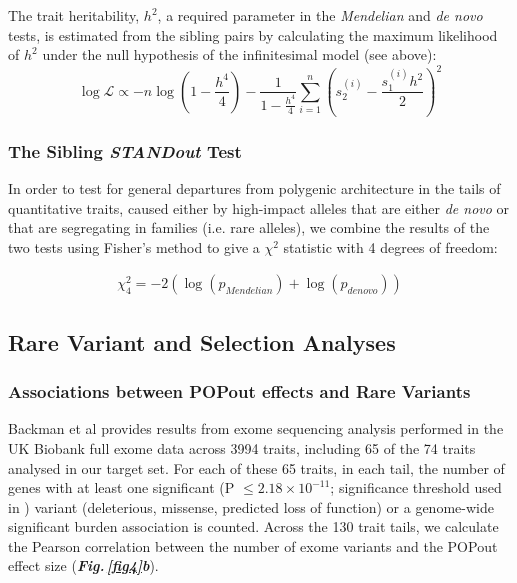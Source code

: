\documentclass[12pt]{zHenriquesLab-StyleBioRxiv}
\newcommand\dref[2]{\normalsize{\textbf{\textit{Fig.\,\ref{#1}#2}}}\normalsize{}}
\begin{document}
The trait heritability, $h^2$, a required parameter in the {\em Mendelian} and {\em de novo} tests, is estimated from the sibling pairs by calculating the maximum likelihood of $h^2$ 
under the null hypothesis of the infinitesimal model (see above): 
\begin{equation*} \log \mathcal{L} \propto -n\log\left(1 -
    \frac{h^4}{4}\right) - \frac{1}{1-\frac{h^4}{4}} \sum_{i=1}^n
  \left( s_{2}^{(i)} - \frac{s_1^{(i)} h^2}{2}
  \right)^2
\end{equation*}

\subsubsection*{The Sibling \textit{STANDout}  Test} 

In order to test for general departures from polygenic architecture in the tails of 
quantitative traits, caused either by high-impact alleles that are either \emph{de novo} or 
that are segregating in families (i.e. rare alleles), we combine the results of the two tests 
using Fisher's method to give a $\chi^2$ statistic with 4 degrees of freedom: 

\begin{align*}
    \chi^2_4 = -2(\log(p_{Mendelian}) + \log(p_{de novo}))
\end{align*}

\subsection*{Rare Variant and Selection Analyses} \label{sec:methods:rvs} 

\subsubsection*{Associations between POPout effects and Rare Variants}
Backman et al \cite{Backman2021} provides results from exome sequencing analysis 
performed in the UK Biobank full exome data across 3994 traits, including 65 of 
the 74 traits analysed in our target set. For each of these 65 traits, in each tail, 
the number of genes with at least one significant (P $\le 2.18\times 10^{-11}$; significance 
threshold used in \cite{Backman2021}) variant (deleterious, missense, predicted loss of function) or a 
genome-wide significant burden association is counted. Across the 130 trait tails, we 
calculate the Pearson correlation between the number of exome variants and the POPout 
effect size (\dref{fig4}{b}). 
%
\end{document}
